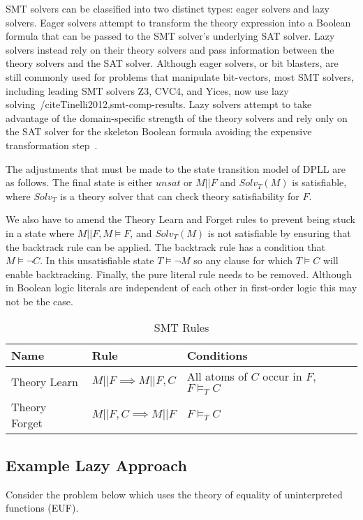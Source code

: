 \documentclass[]{final_report}
\begin{document}
SMT solvers can be classified into two distinct types: eager solvers and lazy solvers. Eager solvers attempt to transform the theory expression into a Boolean formula that can be passed to the SMT solver's underlying SAT solver. Lazy solvers instead rely on their theory solvers and pass information between the theory solvers and the SAT solver. Although eager solvers, or bit blasters, are still commonly used for problems that manipulate bit-vectors, most SMT solvers, including leading SMT solvers Z3, CVC4, and Yices, now use lazy solving~/cite{Tinelli2012,smt-comp-results}. Lazy solvers attempt to take advantage of the domain-specific strength of the theory solvers and rely only on the SAT solver for the skeleton Boolean formula avoiding the expensive transformation step~\cite{sattosmt, smtdpplt}.

The adjustments that must be made to the state transition model of DPLL are as follows. The final state is either $unsat$ or $M || F$ and $Solv _T(M)$ is satisfiable, where $Solv_T$ is a theory solver that can check theory satisfiability for $F$.

We also have to amend the Theory Learn and Forget rules to prevent being stuck in a state where $M || F, M \models F$, and $Solv_T(M)$ is not satisfiable by ensuring that the backtrack rule can be applied. The backtrack rule has a condition that $M \models \lnot C$. In this unsatisfiable state $T \models \lnot{M}$ so any clause for which $T \models C$ will enable backtracking. Finally, the pure literal rule needs to be removed. Although in Boolean logic literals are independent of each other in first-order logic this may not be the case.

\begin{table}[t]
\centering
\label{smt-rulesl}
\begin{tabular}{|l|l|l|}
\hline
Name & Rule & Conditions \\ \hline
Theory Learn & $M || F \implies M|| F, C $ & All atoms of $C$ occur in $F$, $F \models _T C $ \\ \hline
Theory Forget & $M || F, C \implies M || F $ & $F \models _T C$ \\ \hline
\end{tabular}
\caption{SMT Rules}
\end{table}

\subsection{Example Lazy Approach}
Consider the problem below which uses the theory of equality of uninterpreted functions (EUF).
\end{document}
